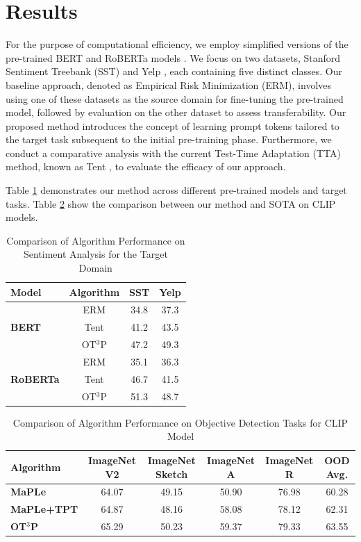 \documentclass[11pt,a4paper]{article}
\begin{document}
\section{Results}
For the purpose of computational efficiency, we employ simplified versions of the pre-trained BERT and RoBERTa models \cite{sanh2020distilbert}. We focus on two datasets, Stanford Sentiment Treebank (SST) and Yelp \cite{zhang2015character}, each containing five distinct classes. Our baseline approach, denoted as Empirical Risk Minimization (ERM), involves using one of these datasets as the source domain for fine-tuning the pre-trained model, followed by evaluation on the other dataset to assess transferability. Our proposed method introduces the concept of learning prompt tokens tailored to the target task subsequent to the initial pre-training phase. Furthermore, we conduct a comparative analysis with the current Test-Time Adaptation (TTA) method, known as Tent \cite{wang2021tent}, to evaluate the efficacy of our approach.

Table \ref{tab:main} demonstrates our method across different pre-trained models and target tasks. Table \ref{tab:main1} show the comparison between our method and SOTA on CLIP models.

\begin{table}[ht]
\centering

\begin{tabular}{lccc}
\hline
\textbf{Model} & \textbf{Algorithm} & \textbf{SST} & \textbf{Yelp} \\
\hline
\multirow{3}{*}{\textbf{BERT}} & ERM & 34.8 & 37.3 \\
& Tent & 41.2 & 43.5 \\
& OT$^3$P & 47.2 & 49.3 \\
\hline

\multirow{3}{*}{\textbf{RoBERTa}} & ERM & 35.1 & 36.3 \\
& Tent & 46.7 & 41.5 \\
& OT$^3$P & 51.3 & 48.7 \\
\hline

\end{tabular}
\caption{\label{tab:a_table} Comparison of Algorithm Performance on Sentiment Analysis for the Target Domain}
\label{tab:main}
\end{table}

\begin{table}[ht]
\centering
\begin{tabular}{lccccc}
\hline
\textbf{Algorithm} & \textbf{ImageNet V2} & \textbf{ImageNet Sketch} & \textbf{ImageNet A} & \textbf{ImageNet R} & \textbf{OOD Avg.} \\
\hline
\textbf{MaPLe} & 64.07 & 49.15 & 50.90 & 76.98 & 60.28 \\
 \textbf{MaPLe+TPT} & 64.87 & 48.16 & 58.08 & 78.12 & 62.31 \\
 \textbf{OT$^3$P} & 65.29 & 50.23 & 59.37 & 79.33 & 63.55 \\
\hline
\end{tabular}
\caption{Comparison of Algorithm Performance on Objective Detection Tasks for CLIP Model}
\label{tab:main1}
\end{table}
\end{document}
